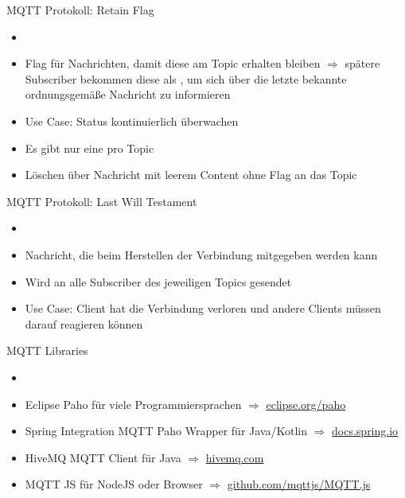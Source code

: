 \begin{frame}{MQTT Protokoll: Retain Flag}   
      \begin{itemize}
        \setlength{\itemindent}{0.75in}
        \item [\textbf{Retain Flag}]
    \end{itemize}
    \begin{itemize}
        \item Flag für Nachrichten, damit diese am Topic erhalten bleiben $\Rightarrow$  spätere Subscriber bekommen diese als , um sich über die letzte bekannte ordnungsgemäße Nachricht zu informieren
        \item Use Case: Status kontinuierlich überwachen
        \item Es gibt nur eine pro Topic
        \item Löschen über Nachricht mit leerem Content ohne Flag an das Topic
     \end{itemize} 
\end{frame}

\begin{frame}{MQTT Protokoll: Last Will Testament}   
         \begin{itemize}
        \setlength{\itemindent}{1.2in}
        \item [\textbf{Last Will Testament}]
    \end{itemize}
    \begin{itemize}
        \item Nachricht, die beim Herstellen der Verbindung mitgegeben werden kann
         \item Wird an alle Subscriber des jeweiligen Topics gesendet
         \item Use Case: Client hat die Verbindung verloren und andere Clients müssen darauf reagieren können
    \end{itemize} 
\end{frame}


\begin{frame}{MQTT Libraries}
              \begin{itemize}
        \setlength{\itemindent}{1.15in}
        \item [\textbf{Libraries für MQTT}]
    \end{itemize}
    \begin{itemize}
        \item Eclipse Paho für viele Programmiersprachen  $\Rightarrow$ \href{https://www.eclipse.org/paho/downloads.php}{eclipse.org/paho}
         \item Spring Integration MQTT Paho Wrapper für Java/Kotlin  $\Rightarrow$ \href{https://docs.spring.io/spring-integration/docs/5.2.1.RELEASE/reference/html/mqtt.html}{docs.spring.io}
         \item HiveMQ MQTT Client für Java  $\Rightarrow$ \href{https://www.hivemq.com/blog/mqtt-client-library-enyclopedia-hivemq-mqtt-client/}{hivemq.com}
         \item MQTT JS für NodeJS oder Browser $\Rightarrow$ \href{https://github.com/mqttjs/MQTT.js}{github.com/mqttjs/MQTT.js}
    \end{itemize} 
\end{frame}

